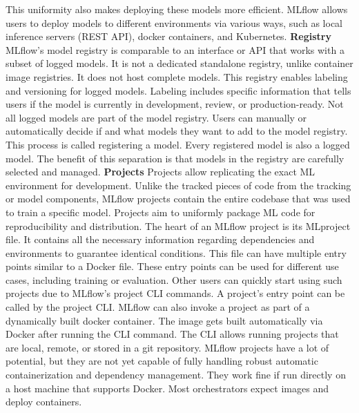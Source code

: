 This uniformity also makes deploying these models more efficient.
MLflow allows users to deploy models to different environments via various ways, such as local inference servers (REST API), docker containers, and Kubernetes.
\vspace{5mm}
\newline
\textbf{Registry}\newline
MLflow's model registry is comparable to an interface or API that works with a subset of logged models.
It is not a dedicated standalone registry, unlike container image registries.
It does not host complete models.
This registry enables labeling and versioning for logged models.
Labeling includes specific information that tells users if the model is currently in development, review, or production-ready.
Not all logged models are part of the model registry.
Users can manually or automatically decide if and what models they want to add to the model registry.
This process is called registering a model.
Every registered model is also a logged model.
The benefit of this separation is that models in the registry are carefully selected and managed.
\vspace{5mm}
\newline
\textbf{Projects}\newline
Projects allow replicating the exact ML environment for development.
Unlike the tracked pieces of code from the tracking or model components, MLflow projects contain the entire codebase that was used to train a specific model.
Projects aim to uniformly package ML code for reproducibility and distribution.
The heart of an MLflow project is its MLproject file.
It contains all the necessary information regarding dependencies and environments to guarantee identical conditions.
This file can have multiple entry points similar to a Docker file.
These entry points can be used for different use cases, including training or evaluation.
Other users can quickly start using such projects due to MLflow's project CLI commands.
A project's entry point can be called by the project CLI.
MLflow can also invoke a project as part of a dynamically built docker container.
The image gets built automatically via Docker after running the CLI command.
The CLI allows running projects that are local, remote, or stored in a git repository.
MLflow projects have a lot of potential, but they are not yet capable of fully handling robust automatic containerization and dependency management.
They work fine if run directly on a host machine that supports Docker.
Most orchestrators expect images and deploy containers.
